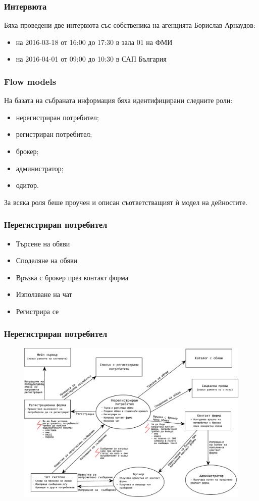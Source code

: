 \documentclass[12pt]{beamer}
\begin{document}
\begin{frame}[fragile]
\frametitle{Интервюта}
Бяха проведени две интервюта със собственика на агенцията Борислав Арнаудов:
	\begin{itemize}
		\item на 2016-03-18 от 16:00 до 17:30 в зала 01 на ФМИ
		\item на 2016-04-01 от 09:00 до 10:30 в САП България
	\end{itemize}
\end{frame}

\begin{frame}[fragile]
\frametitle{Flow models}
На базата на събраната информация бяха идентифицирани следните роли:
\begin{itemize}
	\item нерегистриран потребител;
	\item регистриран потребител;
	\item брокер;
	\item администратор;
	\item одитор.
\end{itemize}
За всяка роля беше проучен и описан съответстващият ѝ модел на дейностите.
\end{frame}

\begin{frame}[fragile]
\frametitle{Нерегистриран потребител}
		\begin{itemize}
		\item {Търсене на обяви}
		\item {Споделяне на обяви}
		\item {Връзка с брокер през контакт форма}
		\item {Използване на чат}
		\item {Регистрира се}
		\end{itemize}
\end{frame}

\begin{frame}[fragile]
\frametitle{Нерегистриран потребител}
	\begin{figure}[h]
	\centering
	\includegraphics[scale=0.50]{flow-unregistered-user}
	\end{figure}
\end{frame}
\end{document}
